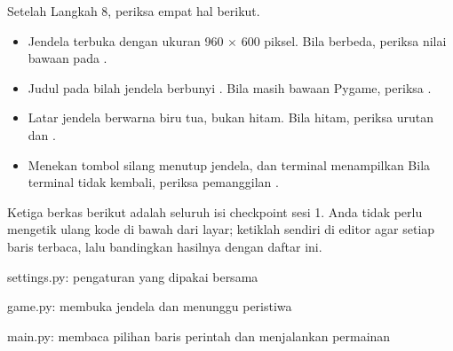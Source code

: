 \begin{ujibox}
Setelah Langkah 8, periksa empat hal berikut.
\begin{itemize}[leftmargin=1.4em, itemsep=0.2em]
  \item Jendela terbuka dengan ukuran 960 $\times$ 600 piksel. Bila berbeda,
        periksa nilai bawaan pada .
  \item Judul pada bilah jendela berbunyi \NamaPermainan. Bila masih bawaan
        Pygame, periksa .
  \item Latar jendela berwarna biru tua, bukan hitam. Bila hitam, periksa
        urutan  dan .
  \item Menekan tombol silang menutup jendela, dan terminal menampilkan
         Bila terminal tidak kembali, periksa
        pemanggilan .
\end{itemize}
\end{ujibox}


Ketiga berkas berikut adalah seluruh isi checkpoint sesi 1. Anda tidak perlu
mengetik ulang kode di bawah dari layar; ketiklah sendiri di editor agar
setiap baris terbaca, lalu bandingkan hasilnya dengan daftar ini.

  {settings.py: pengaturan yang dipakai bersama}

  {game.py: membuka jendela dan menunggu peristiwa}

  {main.py: membaca pilihan baris perintah dan menjalankan permainan}



